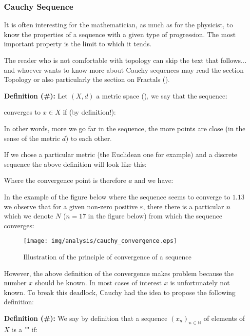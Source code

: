 	\subsubsection{Cauchy Sequence}\label{cauchy sequence}

It is often interesting for the mathematician, as much as for the physicist, to know the properties of a sequence with a given type of progression. The most important property is the limit to which it tends.

	\begin{tcolorbox}[title=Remark,colframe=black,arc=10pt]
The reader who is not comfortable with topology can skip the text that follows... and whoever wants to know more about Cauchy sequences may read the section Topology or also particularly the section on Fractals ().
	\end{tcolorbox}

\textbf{Definition (\#\mydef):} Let $(X, d)$ a metric space (), we say that the sequence:
	
converges to $x \in X$ if (by definition!):
	
In other words, more we go far in the sequence, the more points are close (in the sense of the metric $d$) to each other.

If we chose a particular metric (the Euclidean one for example) and a discrete sequence the above definition will look like this:
	
	Where the convergence point is therefore $a$ and we have:
	
	In the example of the figure below where the sequence seems to converge to $1.13$ we observe that for a given non-zero positive $\varepsilon$, there there is a particular $n$ which we denote $N$ ($n=17$ in the figure below) from which the sequence converges:
	\begin{figure}[H]
		\centering
		\texttt{[image: img/analysis/cauchy\_convergence.eps]}
		\caption{Illustration of the principle of convergence of a sequence}
	\end{figure}

	However, the above definition of the convergence makes problem because the number $x$ should be known. In most cases of interest $x$ is unfortunately not known. To break this deadlock, Cauchy had the idea to propose the following definition:

	\textbf{Definition (\#\mydef):} We say by definition that a sequence $(x_n)_{n \in \mathbb{N}}$ of elements of $X$ is a "" if:
	
